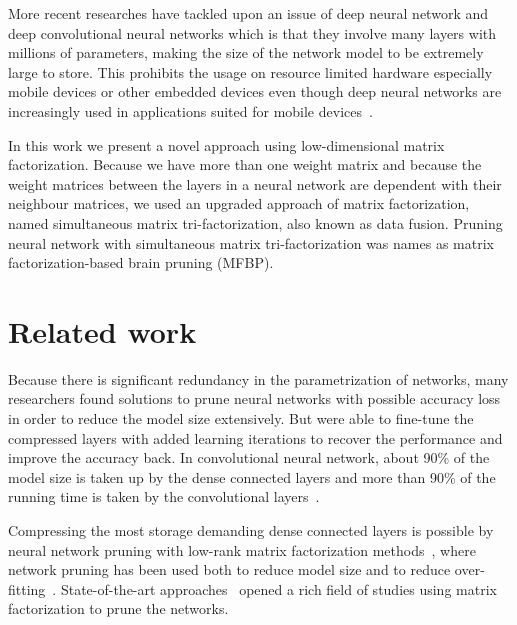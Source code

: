 \documentclass{article} %
\begin{document}
More recent researches have tackled upon an issue of deep neural network and
deep convolutional neural networks which is that they involve many layers with
millions of parameters, making the size of the network model to be extremely
large to store. This prohibits the usage on resource limited hardware
especially mobile devices or other embedded devices even though deep neural
networks are increasingly used in applications suited for mobile
devices~\cite{DBLP:journals/corr/GongLYB14}.

In this work we present a novel approach using low-dimensional matrix
factorization. Because we have more than one weight matrix and because the
weight matrices between the layers in a neural network are dependent with their
neighbour matrices, we used an upgraded approach of matrix factorization, named
simultaneous matrix tri-factorization, also known as data fusion. Pruning
neural network with simultaneous matrix tri-factorization was names as matrix
factorization-based brain pruning (MFBP).


\section{Related work}

Because there is significant redundancy in the parametrization of networks,
many researchers found solutions to prune neural networks with possible
accuracy loss in order to reduce the model size extensively. But were able to
fine-tune the compressed layers with added learning iterations to recover the
performance and improve the accuracy back. In convolutional neural network, about 90\% 
of the model size is taken up by the dense connected layers and more than 90\% 
of the running time is taken by the convolutional 
layers~\cite{zeiler2014visualizing}. 

Compressing the most storage demanding dense connected layers is possible by
neural network pruning with low-rank matrix factorization
methods~\cite{bondarenko2014artificial, schmidhuber2015deep, sainath2013low},
where network pruning has been used both to reduce model size and to reduce
over-fitting~\cite{han2015learning}. State-of-the-art 
approaches~\cite{lecun1989optimal, hassibi1993optimal} opened a rich field of 
studies using matrix factorization to prune the networks.
\end{document}
